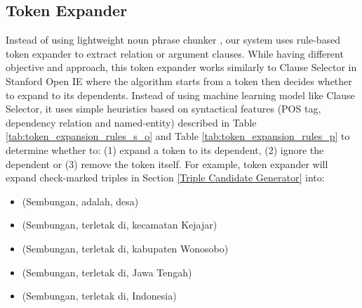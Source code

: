\subsection{Token Expander}

Instead of using lightweight noun phrase chunker \citep{banko2007open}, our system uses rule-based token expander to extract relation or argument clauses. While having different objective and approach, this token expander works similarly to Clause Selector in Stanford Open IE \citep{angeli2015leveraging} where the algorithm starts from a token then decides whether to expand to its dependents. Instead of using machine learning model like Clause Selector, it uses simple heuristics based on syntactical features (POS tag, dependency relation and named-entity) described in Table \ref{tab:token_expansion_rules_s_o} and Table \ref{tab:token_expansion_rules_p} to determine whether to: (1) expand a token to its dependent, (2) ignore the dependent or (3) remove the token itself. For example, token expander will expand check-marked triples in Section \ref{Triple Candidate Generator} into:

\begin{itemize}
\item (Sembungan, adalah, desa)
\item (Sembungan, terletak di, kecamatan Kejajar)
\item (Sembungan, terletak di, kabupaten Wonosobo)
\item (Sembungan, terletak di, Jawa Tengah)
\item (Sembungan, terletak di, Indonesia)
\end{itemize}

